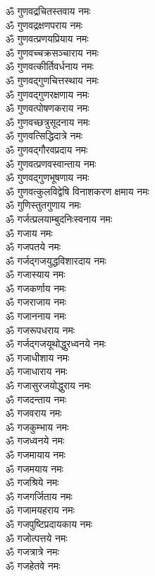 \begin{multicols}{2}
\begin{flushleft}
ॐ गुणवद्रचितस्तवाय नमः\\
ॐ गुणवद्रक्षणपराय नमः\\
ॐ गुणवत्प्रणयप्रियाय नमः\\
ॐ गुणवच्चक्रसञ्चाराय नमः\\
ॐ गुणवत्कीर्तिवर्धनाय नमः\\
ॐ गुणवद्गुणचित्तस्थाय नमः\\
ॐ गुणवद्गुणरक्षणाय नमः\\
ॐ गुणवत्पोषणकराय नमः\\
ॐ गुणवच्छत्रुसूदनाय नमः\\
ॐ गुणवत्सिद्धिदात्रे नमः\hfill{}\\
ॐ गुणवद्गौरवप्रदाय नमः\\
ॐ गुणवत्प्रणवस्वान्ताय नमः\\
ॐ गुणवद्गुणभूषणाय नमः\\
ॐ गुणवत्कुलविद्वेषि विनाशकरण क्षमाय नमः\\
ॐ गुणिस्तुतगुणाय नमः\\
ॐ गर्जत्प्रलयाम्बुद\-निःस्वनाय नमः\\
ॐ गजाय नमः\\
ॐ गजपतये नमः\\
ॐ गर्जद्गजयुद्धविशारदाय नमः\\
ॐ गजास्याय नमः\hfill{}\\
ॐ गजकर्णाय नमः\\
ॐ गजराजाय नमः\\
ॐ गजाननाय नमः\\
ॐ गजरूपधराय नमः\\
ॐ गर्जद्गजयूथोद्धुरध्वनये नमः\\
ॐ गजाधीशाय नमः\\
ॐ गजाधाराय नमः\\
ॐ गजासुरजयोद्धुराय नमः\\
ॐ गजदन्ताय नमः\\
ॐ गजवराय नमः\hfill{}\\
ॐ गजकुम्भाय नमः\\
ॐ गजध्वनये नमः\\
ॐ गजमायाय नमः\\
ॐ गजमयाय नमः\\
ॐ गजश्रिये नमः\\
ॐ गजगर्जिताय नमः\\
ॐ गजामयहराय नमः\\
ॐ गजपुष्टिप्रदायकाय नमः\\
ॐ गजोत्पत्तये नमः\\
ॐ गजत्रात्रे नमः\hfill{}\\
ॐ गजहेतवे नमः\\

\end{flushleft}
\end{multicols}
